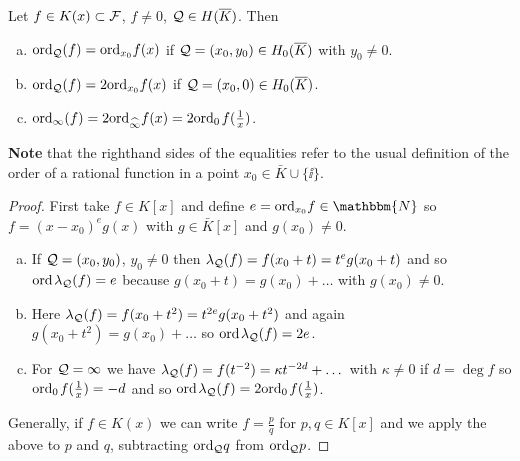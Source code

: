 \documentclass[english,11pt,a4paper]{article}
\begin{document}
\begin{lemma}\label{two}
  Let $f \in K(x) \subset \mathcal{F}$, $f \neq 0$, $\mathcal{Q} \in H(\overline K)$. Then
  \begin{enumerate}[(a)]\parskip 1mm
	  \item $\text{ord}_{\mathcal{Q}} (f) = \text{ord}_{x_0} f(x)$ if $\mathcal{Q} = (x_0,y_0) \in H_0(\overline K)$ with $y_0 \neq 0$.
	  \item $\text{ord}_{\mathcal{Q}} (f) = 2 \text{ord}_{x_0} f(x)$ if $\mathcal{Q} = (x_0,0) \in H_0(\overline K)$.
	  \item $\text{ord}_{\infty} (f) = 2 \text{ord}_{\widehat{\infty}} f(x) = 2 \text{ord}_0\hspace{0.4mm} f(\frac 1 x)$.
	\end{enumerate}\parskip 3mm
	\textbf{Note} that the righthand sides of the equalities refer to the usual definition of the order of a rational function in a point $x_0 \in \bar K \cup \{ \ii \}$.%
	\begin{proof}
		First take $f \in K[x]$ and define $e = \ordx f \in \mathbbm{N}$ so $f = (x-x_0)^e g(x)$ with $g \in \bar K[x]$ and $g(x_0)\neq 0$.
		\begin{enumerate}[(a)]
	  	\item If $\mathcal{Q} =(x_0,y_0)$, $y_0 \neq 0$ then $\lambda_{\mathcal{Q}} (f) = f(x_0 + t) = t^e g(x_0 + t)$ and so $\text{ord\hspace{0.4mm}} \lambda_{\mathcal{Q}} (f) = e$ because $g(x_0 + t) = g(x_0) + \dots$ with $g(x_0) \neq 0$.

	  	\item Here $\lambda_{\mathcal{Q}} (f) = f(x_0 + t^2) = t^{2e} g(x_0 + t^2)$ and again $g(x_0 + t^2) = g(x_0) + \dots$ so $\text{ord\hspace{0.4mm}} \lambda_{\mathcal{Q}} (f) = 2e$.

	  	\item For $\mathcal{Q} = \infty$ we have $\lambda_{\mathcal{Q}} (f) = f(t^{-2}) = \kappa t^{-2d}+ \dots$ with $\kappa \neq 0$ if $d = \deg f$ so $\text{ord}_0\hspace{0.4mm} f(\frac 1 x ) = -d$ and so $\text{ord\hspace{0.4mm}} \lambda_{\mathcal{Q}} (f) = 2 \text{ord}_0\hspace{0.4mm} f(\frac 1 x )$.
		\end{enumerate}
		Generally, if $f \in K(x)$ we can write $f = \frac p q$ for $p, q \in K[x]$ and we apply the above to $p$ and $q$, subtracting $\text{ord}_{\mathcal{Q}} q$ from $\text{ord}_{\mathcal{Q}} p$.%
	\end{proof}
\end{lemma}
\end{document}
